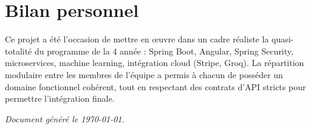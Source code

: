 \documentclass[11pt,a4paper]{report}
\begin{document}
\section{Bilan personnel}

Ce projet a été l'occasion de mettre en œuvre dans un cadre réaliste la quasi-
totalité du programme de la 4 année : Spring Boot, Angular, Spring
Security, microservices, machine learning, intégration cloud (Stripe, Groq).
La répartition modulaire entre les membres de l'équipe a permis à chacun de
posséder un domaine fonctionnel cohérent, tout en respectant des contrats
d'API stricts pour permettre l'intégration finale.

\bigskip

\noindent\textit{Document généré le \today.}
\end{document}
